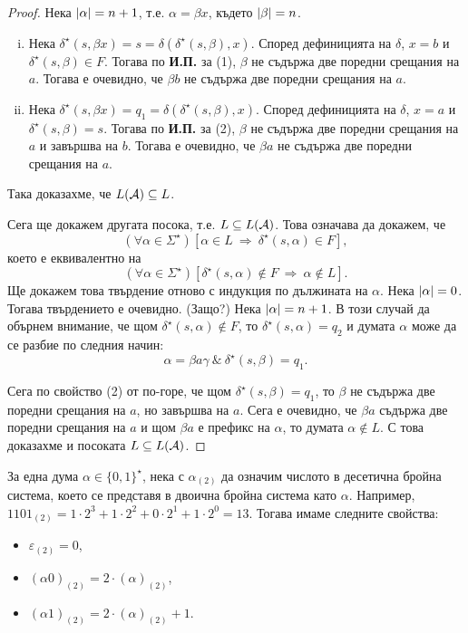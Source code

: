 \begin{proof}
 Нека $\vert{\alpha}\vert = n+1$, т.е. $\alpha = \beta x$, където $\vert{\beta}\vert = n$.
 \begin{enumerate}[(i)]
 \item 
   Нека $\delta^\star(s,\beta x) = s = \delta(\delta^\star(s,\beta),x)$.
   Според дефиницията на $\delta$, $x = b$ и $\delta^\star(s,\beta) \in F$.
   Тогава по {\bf И.П.} за (1), $\beta$ не съдържа две поредни срещания на $a$.
   Тогава е очевидно, че $\beta b$ не  съдържа две поредни срещания на $a$.
 \item
   Нека $\delta^\star(s,\beta x) = q_1 = \delta(\delta^\star(s,\beta),x)$.
   Според дефиницията на $\delta$, $x = a$ и $\delta^\star(s,\beta) = s$.
   Тогава по {\bf И.П.} за (2), $\beta$ не съдържа две поредни срещания на $a$
   и завършва на $b$.
   Тогава е очевидно, че $\beta a$ не съдържа две поредни срещания на $a$.
 \end{enumerate}
 
 Така доказахме, че $L(\mathcal{A}) \subseteq L$.

 Сега ще докажем другата посока, т.е. $L \subseteq L(\mathcal{A})$.
 Това означава да докажем, че
 \[(\forall \alpha \in \Sigma^\star)[\alpha \in L\ \Rightarrow\ \delta^\star(s,\alpha) \in F],\]
 което е еквивалентно на
 \[(\forall \alpha \in \Sigma^\star)[\delta^\star(s,\alpha) \not\in F\ \Rightarrow\ \alpha\not\in L].\]
 Ще докажем това твърдение отново с индукция по дължината на $\alpha$.
 Нека $\vert{\alpha}\vert = 0$. Тогава твърдението е очевидно. (Защо?)
 Нека $\vert{\alpha}\vert = n+1$. В този случай 
 да обърнем внимание, че щом $\delta^\star(s,\alpha) \not\in F$, то
 $\delta^\star(s,\alpha) = q_2$ и думата $\alpha$ може да се разбие по следния начин:
 \[\alpha = \beta a \gamma\ \&\ \delta^\star(s,\beta) = q_1.\]
 
 Сега по свойство (2) от по-горе, че щом $\delta^\star(s,\beta) = q_1$, то
 $\beta$ не съдържа две поредни срещания на $a$, но завършва на $a$.
 Сега е очевидно, че $\beta a$ съдържа две поредни срещания на $a$ и 
 щом $\beta a$ е префикс на $\alpha$, то думата $\alpha \not\in L$.
 С това доказахме и посоката $L\subseteq L(\mathcal{A})$.
\end{proof}



\begin{framed}
  За една дума $\alpha \in \{0,1\}^\star$, 
  нека с $\alpha_{(2)}$ да означим числото в десетична бройна система, което се представя в двоична бройна система като $\alpha$.
  Например, $1101_{(2)} = 1 \cdot 2^3+1\cdot 2^2+0\cdot 2^1+1\cdot 2^0 = 13$.
  Тогава имаме следните свойства:
  \begin{itemize}
  \item
    $\varepsilon_{(2)} = 0$,
  \item
    $(\alpha0)_{(2)} = 2\cdot(\alpha)_{(2)}$,
  \item
    $(\alpha1)_{(2)} = 2\cdot(\alpha)_{(2)} + 1$.
  \end{itemize}
\end{framed}

